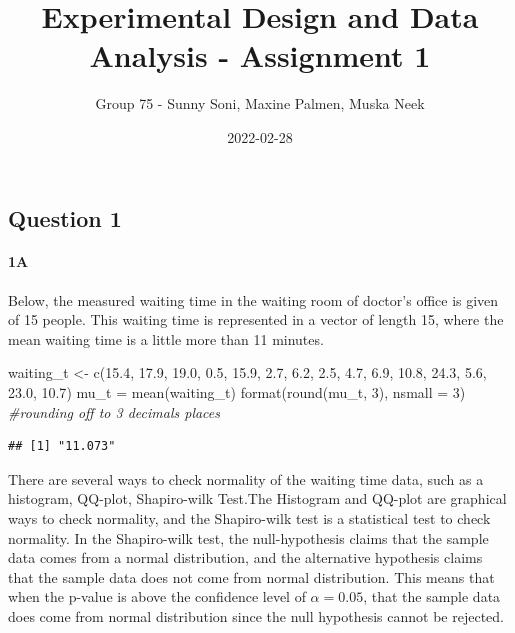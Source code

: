 \documentclass[
]{article}
\title{Experimental Design and Data Analysis - Assignment 1}
\author{Group 75 - Sunny Soni, Maxine Palmen, Muska Neek}
\date{2022-02-28}
\newenvironment{Shaded}{\begin{snugshade}}{\end{snugshade}}
\newcommand{\AttributeTok}[1]{\textcolor[rgb]{0.77,0.63,0.00}{#1}}
\newcommand{\CommentTok}[1]{\textcolor[rgb]{0.56,0.35,0.01}{\textit{#1}}}
\newcommand{\DecValTok}[1]{\textcolor[rgb]{0.00,0.00,0.81}{#1}}
\newcommand{\FloatTok}[1]{\textcolor[rgb]{0.00,0.00,0.81}{#1}}
\newcommand{\FunctionTok}[1]{\textcolor[rgb]{0.00,0.00,0.00}{#1}}
\newcommand{\NormalTok}[1]{#1}
\newcommand{\OtherTok}[1]{\textcolor[rgb]{0.56,0.35,0.01}{#1}}
\begin{document}
\maketitle

\hypertarget{question-1}{%
\subsection{Question 1}\label{question-1}}

\hypertarget{a}{%
\paragraph{\texorpdfstring{\textbf{1A}}{1A}}\label{a}}

Below, the measured waiting time in the waiting room of doctor's office
is given of 15 people. This waiting time is represented in a vector of
length 15, where the mean waiting time is a little more than 11 minutes.

\begin{Shaded}
\begin{Highlighting}[]
\NormalTok{waiting\_t }\OtherTok{\textless{}{-}} \FunctionTok{c}\NormalTok{(}\FloatTok{15.4}\NormalTok{, }\FloatTok{17.9}\NormalTok{, }\FloatTok{19.0}\NormalTok{, }\FloatTok{0.5}\NormalTok{, }\FloatTok{15.9}\NormalTok{, }\FloatTok{2.7}\NormalTok{, }\FloatTok{6.2}\NormalTok{, }\FloatTok{2.5}\NormalTok{, }\FloatTok{4.7}\NormalTok{, }\FloatTok{6.9}\NormalTok{, }\FloatTok{10.8}\NormalTok{, }\FloatTok{24.3}\NormalTok{, }\FloatTok{5.6}\NormalTok{, }\FloatTok{23.0}\NormalTok{, }\FloatTok{10.7}\NormalTok{)}
\NormalTok{mu\_t }\OtherTok{=} \FunctionTok{mean}\NormalTok{(waiting\_t)}
\FunctionTok{format}\NormalTok{(}\FunctionTok{round}\NormalTok{(mu\_t, }\DecValTok{3}\NormalTok{), }\AttributeTok{nsmall =} \DecValTok{3}\NormalTok{) }\CommentTok{\#rounding off to 3 decimals places }
\end{Highlighting}
\end{Shaded}

\begin{verbatim}
## [1] "11.073"
\end{verbatim}

There are several ways to check normality of the waiting time data, such
as a histogram, QQ-plot, Shapiro-wilk Test.The Histogram and QQ-plot are
graphical ways to check normality, and the Shapiro-wilk test is a
statistical test to check normality. In the Shapiro-wilk test, the
null-hypothesis claims that the sample data comes from a normal
distribution, and the alternative hypothesis claims that the sample data
does not come from normal distribution. This means that when the p-value
is above the confidence level of \(\alpha=0.05\), that the sample data
does come from normal distribution since the null hypothesis cannot be
rejected.
\end{document}
